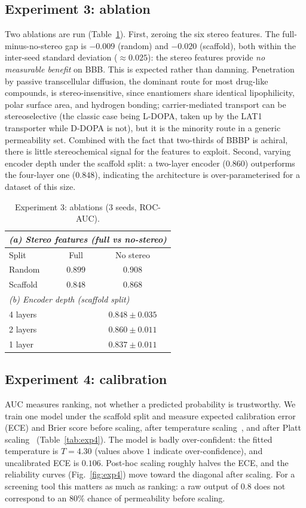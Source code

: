 \documentclass[conference]{IEEEtran}
\begin{document}
\subsection{Experiment 3: ablation}
Two ablations are run (Table~\ref{tab:exp3}). First, zeroing the six stereo
features. The full-minus-no-stereo gap is $-0.009$ (random) and $-0.020$
(scaffold), both within the inter-seed standard deviation ($\approx 0.025$): the
stereo features provide \emph{no measurable benefit} on BBB. This is expected
rather than damning. Penetration by passive transcellular diffusion, the dominant
route for most drug-like compounds, is stereo-insensitive, since enantiomers share
identical lipophilicity, polar surface area, and hydrogen bonding; carrier-mediated
transport can be stereoselective (the classic case being L-DOPA, taken up by the
LAT1 transporter while D-DOPA is not), but it is the minority route in a generic
permeability set. Combined with the fact that two-thirds of BBBP is achiral, there
is little stereochemical signal for the features to exploit. Second,
varying encoder depth under the scaffold split: a two-layer encoder
($0.860$) outperforms the four-layer one ($0.848$), indicating the architecture is
over-parameterised for a dataset of this size.

\begin{table}[t]
\caption{Experiment 3: ablations (3 seeds, ROC-AUC).}
\label{tab:exp3}
\centering
\begin{tabular}{lcc}
\toprule
\multicolumn{3}{l}{\emph{(a) Stereo features (full vs no-stereo)}} \\
\midrule
Split & Full & No stereo \\
Random   & $0.899$ & $0.908$ \\
Scaffold & $0.848$ & $0.868$ \\
\midrule
\multicolumn{3}{l}{\emph{(b) Encoder depth (scaffold split)}} \\
\midrule
\multicolumn{2}{l}{4 layers} & $0.848 \pm 0.035$ \\
\multicolumn{2}{l}{2 layers} & $0.860 \pm 0.011$ \\
\multicolumn{2}{l}{1 layer}  & $0.837 \pm 0.011$ \\
\bottomrule
\end{tabular}
\end{table}

\subsection{Experiment 4: calibration}
AUC measures ranking, not whether a predicted probability is trustworthy. We train
one model under the scaffold split and measure expected calibration error (ECE)
and Brier score before scaling, after temperature scaling~\cite{guo2017}, and
after Platt scaling~\cite{platt1999} (Table~\ref{tab:exp4}). The model is badly
over-confident: the fitted temperature is $T=4.30$ (values above $1$ indicate
over-confidence), and uncalibrated ECE is $0.106$. Post-hoc scaling roughly halves
the ECE, and the reliability curves (Fig.~\ref{fig:exp4}) move toward the diagonal
after scaling. For a screening tool this matters as much as ranking: a raw output
of $0.8$ does not correspond to an $80\%$ chance of permeability before scaling.
\end{document}
